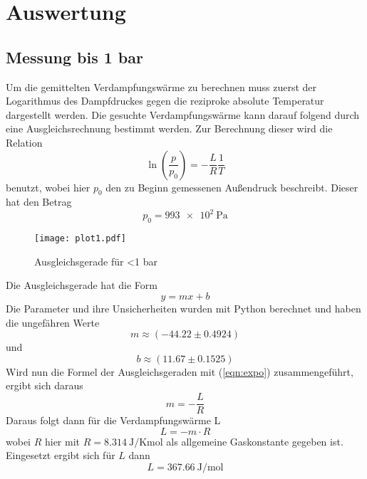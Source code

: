 \section{Auswertung}
\label{sec:Auswertung}


\subsection{Messung bis 1 bar}
Um die gemittelten Verdampfungswärme zu berechnen muss zuerst der Logarithmus des Dampfdruckes gegen die reziproke absolute Temperatur dargestellt werden. Die gesuchte
Verdampfungswärme kann darauf folgend durch eine Ausgleichsrechnung bestimmt werden. Zur Berechnung dieser wird die Relation
\begin{equation*}
  \label{eqn:druck3}
  \ln\left(\frac{p}{p_0}\right)=- \frac{L}{R} \frac{1}{T}
\end{equation*}
\newline
benutzt, wobei hier $p_0$ den zu Beginn gemessenen Außendruck beschreibt. Dieser hat den Betrag
\begin{equation*}
  p_0 = \SI{993e2}{\pascal}    %
\end{equation*}

\begin{figure}[H]
  \centering
  \texttt{[image: plot1.pdf]}
  \caption{Ausgleichsgerade für <1 bar}
  \label{fig:plot1}
\end{figure}
\noindent
Die Ausgleichsgerade hat die Form
\begin{equation*}
  y = mx + b
\end{equation*}
Die Parameter und ihre Unsicherheiten wurden mit Python berechnet und haben die ungefähren Werte
\begin{equation*}
  m \approx (-44.22\pm 0.4924)
\end{equation*}
und
\begin{equation*}
  b \approx (11.67\pm 0.1525)
\end{equation*}
Wird nun die Formel der Ausgleichsgeraden mit (\ref{eqn:expo}) zusammengeführt, ergibt sich daraus
\begin{equation*}
  m=-\frac{L}{R}
\end{equation*}
Daraus folgt dann für die Verdampfungswärme L
\begin{equation*}
  L = - m \cdot R
\end{equation*}
wobei $R$ hier mit $R=\SI{8,314}{\joule\per\kelvin\mole}$ als allgemeine Gaskonstante gegeben ist.
Eingesetzt ergibt sich für $L$ dann
\begin{equation*}
  L = \SI{367,66}{\joule\per\mole}
\end{equation*}

